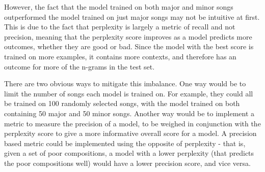 \documentclass{sig-alternate}
\begin{document}
However, the fact that the model trained on both major and minor songs outperformed the model trained on just major songs may not be intuitive at first. This is due to the fact that perplexity is largely a metric of recall and not precision, meaning that the perplexity score improves as a model predicts more outcomes, whether they are good or bad. Since the model with the best score is trained on more examples, it contains more contexts, and therefore has an outcome for more of the n-grams in the test set.

There are two obvious ways to mitigate this imbalance. One way would be to limit the number of songs each model is trained on. For example, they could all be trained on 100 randomly selected songs, with the model trained on both containing 50 major and 50 minor songs. Another way would be to implement a metric to measure the precision of a model, to be weighed in conjunction with the perplexity score to give a more informative overall score for a model. A precision based metric could be implemented using the opposite of perplexity - that is, given a set of poor compositions, a model with a lower perplexity (that predicts the poor compositions well) would have a lower precision score, and vice versa.
\end{document}
